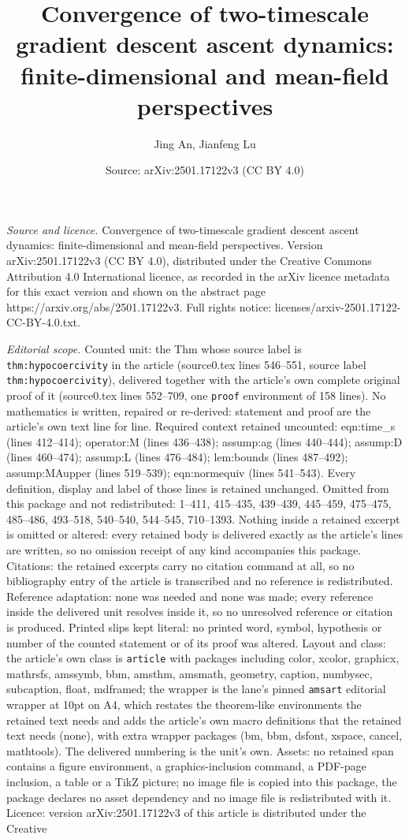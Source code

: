 \documentclass[10pt,a4paper]{amsart}
\title[Convergence of two-timescale gradient descent ascent dynamic]{Convergence of two-timescale gradient descent ascent dynamics: finite-dimensional and mean-field perspectives}
\author{Jing An, Jianfeng Lu}
\date{Source: arXiv:2501.17122v3 (CC BY 4.0)}
\begin{document}
\maketitle

\noindent\emph{Source and licence.} Convergence of two-timescale gradient descent ascent dynamics: finite-dimensional and mean-field perspectives. Version arXiv:2501.17122v3 (CC BY 4.0), distributed under the Creative Commons Attribution 4.0 International licence, as recorded in the arXiv licence metadata for this exact version and shown on the abstract page https://arxiv.org/abs/2501.17122v3. Full rights notice: licenses/arxiv-2501.17122-CC-BY-4.0.txt.\par\smallskip

\noindent\textit{Editorial scope.} Counted unit: the Thm whose source label is \texttt{thm:hypocoercivity} in the article (source0.tex lines 546--551, source label \texttt{thm:hypocoercivity}), delivered together with the article's own complete original proof of it (source0.tex lines 552--709, one \texttt{proof} environment of 158 lines). No mathematics is written, repaired or re-derived: statement and proof are the article's own text line for line. Required context retained uncounted: eqn:time\_s (lines 412--414); operator:M (lines 436--438); assump:ag (lines 440--444); assump:D (lines 460--474); assump:L (lines 476--484); lem:bounds (lines 487--492); assump:MAupper (lines 519--539); eqn:normequiv (lines 541--543). Every definition, display and label of those lines is retained unchanged. Omitted from this package and not redistributed: 1--411, 415--435, 439--439, 445--459, 475--475, 485--486, 493--518, 540--540, 544--545, 710--1393. Nothing inside a retained excerpt is omitted or altered: every retained body is delivered exactly as the article's lines are written, so no omission receipt of any kind accompanies this package. Citations: the retained excerpts carry no citation command at all, so no bibliography entry of the article is transcribed and no reference is redistributed. Reference adaptation: none was needed and none was made; every reference inside the delivered unit resolves inside it, so no unresolved reference or citation is produced. Printed slips kept literal: no printed word, symbol, hypothesis or number of the counted statement or of its proof was altered. Layout and class: the article's own class is \texttt{article} with packages including color, xcolor, graphicx, mathrsfs, amssymb, bbm, amsthm, amsmath, geometry, caption, numbysec, subcaption, float, mdframed; the wrapper is the lane's pinned \texttt{amsart} editorial wrapper at 10pt on A4, which restates the theorem-like environments the retained text needs and adds the article's own macro definitions that the retained text needs (none), with extra wrapper packages (bm, bbm, dsfont, xspace, cancel, mathtools). The delivered numbering is the unit's own. Assets: no retained span contains a figure environment, a graphics-inclusion command, a PDF-page inclusion, a table or a TikZ picture; no image file is copied into this package, the package declares no asset dependency and no image file is redistributed with it. Licence: version arXiv:2501.17122v3 of this article is distributed under the Creative 
\end{document}
